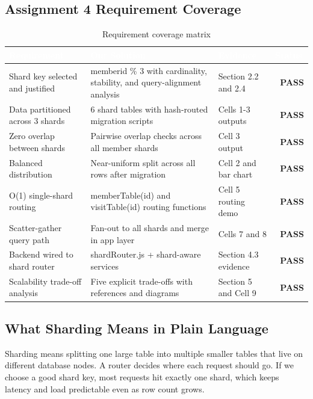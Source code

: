 \documentclass[a4paper,12pt]{article}
\newcommand{\yes}{\textcolor{tickgreen}{\textbf{\checkmark~PASS}}}
\newcommand{\tablehead}[1]{\textcolor{white}{\textbf{#1}}}
\begin{document}
\subsection{Assignment 4 Requirement Coverage}

\begin{table}[H]
\centering
\caption{Requirement coverage matrix}
\begin{tcolorbox}[tableframe,width=\textwidth,box align=center]
\footnotesize
{}
\begin{tabularx}{\textwidth}{L{4.2cm} Y L{2.7cm} C{1.9cm}}
\toprule
{}
\tablehead{Requirement} & \tablehead{Our Solution} & \tablehead{Evidence} & \tablehead{Status} \\
\midrule
Shard key selected and justified & memberid \% 3 with cardinality, stability, and query-alignment analysis & Section 2.2 and 2.4 & \yes \\
Data partitioned across 3 shards & 6 shard tables with hash-routed migration scripts & Cells 1-3 outputs & \yes \\
Zero overlap between shards & Pairwise overlap checks across all member shards & Cell 3 output & \yes \\
Balanced distribution & Near-uniform split across all rows after migration & Cell 2 and bar chart & \yes \\
O(1) single-shard routing & memberTable(id) and visitTable(id) routing functions & Cell 5 routing demo & \yes \\
Scatter-gather query path & Fan-out to all shards and merge in app layer & Cells 7 and 8 & \yes \\
Backend wired to shard router & shardRouter.js + shard-aware services & Section 4.3 evidence & \yes \\
Scalability trade-off analysis & Five explicit trade-offs with references and diagrams & Section 5 and Cell 9 & \yes \\
\bottomrule
\end{tabularx}
\end{tcolorbox}
\end{table}

\subsection{What Sharding Means in Plain Language}

\begin{tcolorbox}[insightbox]
Sharding means splitting one large table into multiple smaller tables that live on different database nodes. A router decides where each request should go. If we choose a good shard key, most requests hit exactly one shard, which keeps latency and load predictable even as row count grows.
\end{tcolorbox}
\end{document}
